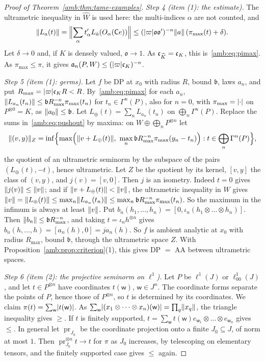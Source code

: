 \begin{proof}[Proof of Theorem~\ref{amb:thm:tame-examples}]
\emph{Step 4 (item (1): the estimate).} The ultrametric inequality in $\widehat W$ is used here: the multi-indices $\alpha$
are not counted, and
\[
 \lVert L_a(t)\rVert=\Bigl\lVert\sum_\alpha t'_\alpha L_{\hat a}(O_\alpha(\mathsf Ce))\Bigr\rVert
 \le(\lvert \varpi\rvert\mathfrak o\mathfrak o')^{-n}\lVert a\rVert\,(\pi_{\max}(t)+\delta).
\]
Let $\delta\to0$ and, if $K$ is densely valued, $\mathfrak o\to1$. As $\mathfrak c_{\widehat K}=\mathfrak c_K$, this
is~\eqref{amb:eq:pimax}. As $\pi_{\max}\le\pi$, it gives $\mathfrak a_n(P,W)\le(\lvert \varpi\rvert\mathfrak c_K)^{-n}$.

\emph{Step 5 (item (1): germs).} Let $f$ be DP at $x_0$ with radius $R$, bound $\mathfrak b$, laws $a_n$, and put
$R_{\max}=\lvert \varpi\rvert\mathfrak c_KR<R$. By~\eqref{amb:eq:pimax} for each $a_n$, $\lVert L_{a_n}(t_n)\rVert\le \mathfrak bR_{\max}^{-n}\pi_{\max}(t_n)$ for $t_n\in\Gamma^n(P)$,
also for $n=0$, with $\pi_{\max}=\lvert \cdot\rvert$ on $P^{\otimes0}=K$, as $\lVert a_0\rVert\le \mathfrak b$. Let $L_\oplus(t)=\sum_nL_{a_n}(t_n)$ on $\bigoplus_n\Gamma^n(P)$. Replace the sums in~\eqref{amb:eq:pushout} by
maxima: on $W\oplus\bigoplus_nP^{\otimes n}$ let
\[
 \norm{(v,y)}_Z=\inf\Bigl\{\max\Bigl(\norm{v+L_\oplus(t)},\ \max_n\mathfrak bR_{\max}^{-n}\pi_{\max}(y_n-t_n)\Bigr):t\in\bigoplus_n\Gamma^n(P)\Bigr\},
\]
the quotient of an ultrametric seminorm by the subspace of the pairs $(L_\oplus(t),-t)$, hence ultrametric. Let $Z$ be the
quotient by its kernel, $[v,y]$ the class of $(v,y)$, and $j(v)=[v,0]$. Then $j$ is an isometry. Indeed $t=0$ gives
$\lVert j(v)\rVert\le\lVert v\rVert$; and if $\lVert v+L_\oplus(t)\rVert<\lVert v\rVert$, the ultrametric inequality in $W$ gives
$\lVert v\rVert=\lVert L_\oplus(t)\rVert\le\max_n\lVert L_{a_n}(t_n)\rVert\le\max_n\mathfrak bR_{\max}^{-n}\pi_{\max}(t_n)$. So the maximum in the infimum is always
at least $\lVert v\rVert$. Put
$b_n(h_1,\dots,h_n)=[0,\iota_n(h_1\otimes\dots\otimes h_n)]$. Then $\lVert b_n\rVert\le \mathfrak bR_{\max}^{-n}$, and taking $t=\iota_nh^{\otimes n}$ gives
$b_n(h,\dots,h)=[a_n(h),0]=ja_n(h)$. So $f$ is ambient analytic at $x_0$ with radius $R_{\max}$, bound $\mathfrak b$,
through the ultrametric space $Z$. With Proposition~\ref{amb:prop:criterion}(1), this gives DP $=$ AA between ultrametric
spaces.

\emph{Step 6 (item (2): the projective seminorm on $\ell^1$).} Let $P$ be $\ell^1(J)$ or $\ell^1_{00}(J)$, and let $t\in P^{\otimes n}$ have
coordinates $t(\mathsf w)$, $\mathsf w\in J^n$. The coordinate forms separate the points of $P$, hence those of $P^{\otimes n}$, so $t$ is determined by its coordinates. We claim $\pi(t)=\sum_{\mathsf w}\lvert t(\mathsf w)\rvert$. As
$\sum_{\mathsf w}\lvert (x_1\otimes\dots\otimes x_n)(\mathsf w)\rvert=\prod_q\lVert x_q\rVert$, the triangle inequality gives $\ge$. If $t$
is finitely supported, $t=\sum_{\mathsf w}t(\mathsf w)e_{\mathsf w_1}\otimes\dots\otimes e_{\mathsf w_n}$ gives $\le$. In
general let $\operatorname{pr}_{J_0}$ be the coordinate projection onto a finite $J_0\subseteq J$, of norm at most $1$. Then
$\operatorname{pr}_{J_0}^{\otimes n}t\to t$ for $\pi$ as $J_0$ increases, by telescoping on elementary tensors, and the
finitely supported case gives $\le$ again.


\end{proof}
